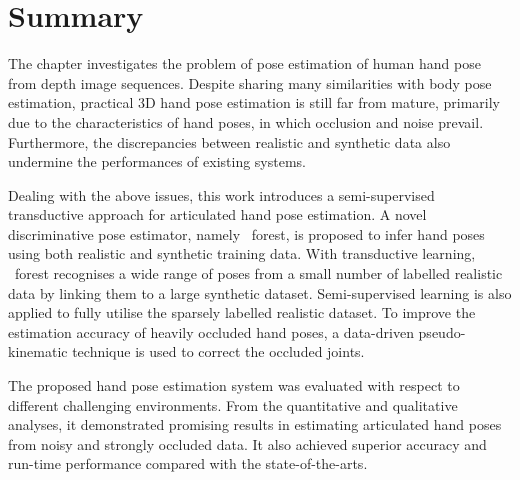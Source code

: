 \section{Summary}

The chapter investigates the problem of pose estimation of human hand pose from depth image sequences. 
Despite sharing many similarities with body pose estimation, practical 3D hand pose estimation is still far from mature, primarily due to the characteristics of hand poses, in which occlusion and noise prevail. 
Furthermore, the discrepancies between realistic and synthetic data also undermine the performances of existing systems. 

Dealing with the above issues, this work introduces a semi-supervised transductive approach for articulated hand pose estimation. A novel discriminative pose estimator, namely \STR\ forest, is proposed to infer hand poses using both realistic and synthetic training data. 
With transductive learning, \STR\ forest recognises a wide range of poses from a small number of labelled realistic data by linking them to a large synthetic dataset.
Semi-supervised learning is also applied to fully utilise the sparsely labelled realistic dataset. 
To improve the estimation accuracy of heavily occluded hand poses, a data-driven pseudo-kinematic technique is used to correct the occluded joints.  

The proposed hand pose estimation system was evaluated with respect to different challenging environments. From the quantitative and qualitative analyses, it demonstrated promising results in estimating articulated hand poses from noisy and strongly occluded data.  
It also achieved superior accuracy and run-time performance compared with the state-of-the-arts.  
